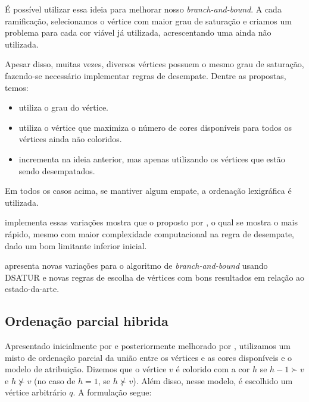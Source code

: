 \documentclass[11pt]{article}
\begin{document}
É possível utilizar essa ideia para melhorar nosso \emph{branch-and-bound}.
A cada ramificação, selecionamos o vértice com maior grau de saturação e criamos um problema para cada cor viável já utilizada, acrescentando uma ainda não utilizada.

Apesar disso, muitas vezes, diversos vértices possuem o mesmo grau de saturação, fazendo-se necessário implementar regras de desempate.
Dentre as propostas, temos:
\begin{itemize}
\item \textcite{Brelaz1979Newmethodscolor} utiliza o grau do vértice.
\item \textcite{Sewell1996improvedalgorithmexact} utiliza o vértice que maximiza o número de cores disponíveis para todos os vértices ainda não coloridos.
\item \textcite{Segundo2012newDSATURbased} incrementa na ideia anterior, mas apenas utilizando os vértices que estão sendo desempatados.
\end{itemize}
Em todos os casos acima, se mantiver algum empate, a ordenação lexigráfica é utilizada.

\textcite{Ternier2017ExactAlgorithmsVertex} implementa essas variações mostra que o proposto por \textcite{Sewell1996improvedalgorithmexact}, o qual se mostra o mais rápido, mesmo com maior complexidade computacional na regra de desempate, dado um bom limitante inferior inicial.

\textcite{Ternier2017ExactAlgorithmsVertex} apresenta novas variações para o algoritmo de \emph{branch-and-bound} usando DSATUR e novas regras de escolha de vértices com bons resultados em relação ao estado-da-arte.
\subsection{Ordenação parcial hibrida}
\label{sec:orgec90813}
Apresentado inicialmente por \autocite{Jabrayilov2018NewIntegerLinear} e posteriormente melhorado por \autocite{Jabrayilov2022StrengthenedPartialOrdering}, utilizamos um misto de ordenação parcial da união entre os vértices e as cores disponíveis e o modelo de atribuição.
Dizemos que o vértice \(v\) é colorido com a cor \(h\) se \(h-1 \succ v\) e \(h \nsucc v\) (no caso de \(h=1\), se \(h \nsucc v\)). 
Além disso, nesse modelo, é escolhido um vértice arbitrário \(q\).
A formulação segue:
\end{document}

